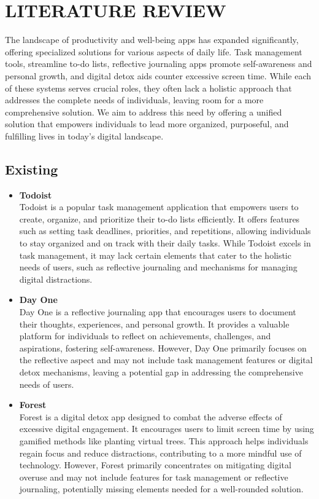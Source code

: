 
\section{LITERATURE REVIEW}
The landscape of productivity and well-being apps has expanded significantly, offering specialized solutions for various aspects of daily life. Task management tools, streamline to-do lists, reflective journaling apps promote self-awareness and personal growth, and digital detox aids counter excessive screen time. While each of these systems serves crucial roles, they often lack a holistic approach that addresses the complete needs of individuals, leaving room for a more comprehensive solution. We aim to address this need by offering a unified solution that empowers individuals to lead more organized, purposeful, and fulfilling lives in today's digital landscape.
\subsection{Existing}

\begin{itemize}
    \item \textbf{Todoist}\\
    Todoist is a popular task management application that empowers users to create, organize, and prioritize their to-do lists efficiently. It offers features such as setting task deadlines, priorities, and repetitions, allowing individuals to stay organized and on track with their daily tasks. While Todoist excels in task management, it may lack certain elements that cater to the holistic needs of users, such as reflective journaling and mechanisms for managing digital distractions.

    \item \textbf{Day One}\\
    Day One is a reflective journaling app that encourages users to document their thoughts, experiences, and personal growth. It provides a valuable platform for individuals to reflect on achievements, challenges, and aspirations, fostering self-awareness. However, Day One primarily focuses on the reflective aspect and may not include task management features or digital detox mechanisms, leaving a potential gap in addressing the comprehensive needs of users.

    \item \textbf{Forest}\\
    Forest is a digital detox app designed to combat the adverse effects of excessive digital engagement. It encourages users to limit screen time by using gamified methods like planting virtual trees. This approach helps individuals regain focus and reduce distractions, contributing to a more mindful use of technology. However, Forest primarily concentrates on mitigating digital overuse and may not include features for task management or reflective journaling, potentially missing elements needed for a well-rounded solution.
\end{itemize}
\vspace{0.5in}

